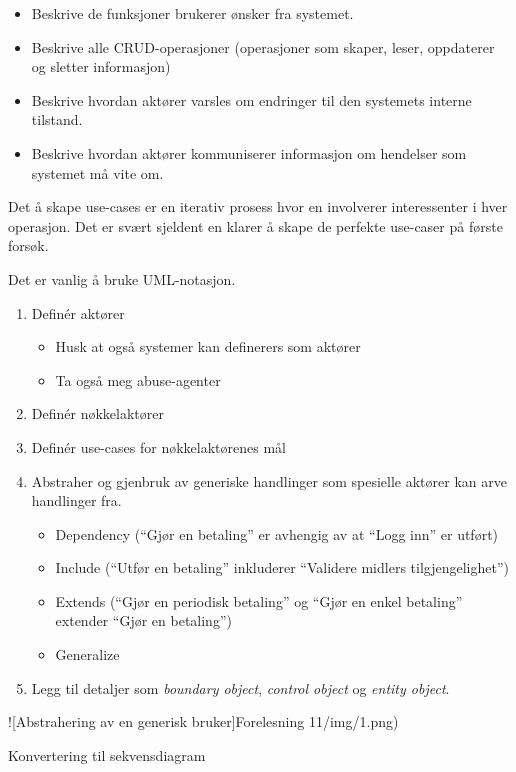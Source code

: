 \begin{itemize}
\item
  Beskrive de funksjoner brukerer ønsker fra systemet.
\item
  Beskrive alle CRUD-operasjoner (operasjoner som skaper, leser,
  oppdaterer og sletter informasjon)
\item
  Beskrive hvordan aktører varsles om endringer til den systemets
  interne tilstand.
\item
  Beskrive hvordan aktører kommuniserer informasjon om hendelser som
  systemet må vite om.
\end{itemize}
Det å skape use-cases er en iterativ prosess hvor en involverer
interessenter i hver operasjon. Det er svært sjeldent en klarer å skape
de perfekte use-caser på første forsøk.

Det er vanlig å bruke UML-notasjon.

\begin{enumerate}[1.]
\item
  Definér aktører
  \begin{itemize}
  \item
    Husk at også systemer kan definerers som aktører
  \item
    Ta også meg abuse-agenter
  \end{itemize}
\item
  Definér nøkkelaktører
\item
  Definér use-cases for nøkkelaktørenes mål
\item
  Abstraher og gjenbruk av generiske handlinger som spesielle aktører
  kan arve handlinger fra.
  \begin{itemize}
  \item
    Dependency (``Gjør en betaling'' er avhengig av at ``Logg inn'' er
    utført)
  \item
    Include (``Utfør en betaling'' inkluderer ``Validere midlers
    tilgjengelighet'')
  \item
    Extends (``Gjør en periodisk betaling'' og ``Gjør en enkel
    betaling'' extender ``Gjør en betaling'')
  \item
    Generalize
  \end{itemize}
\item
  Legg til detaljer som \emph{boundary object}, \emph{control object} og
  \emph{entity object}.
\end{enumerate}
!{[}Abstrahering av en generisk bruker{]}Forelesning 11/img/1.png)

Konvertering til sekvensdiagram

